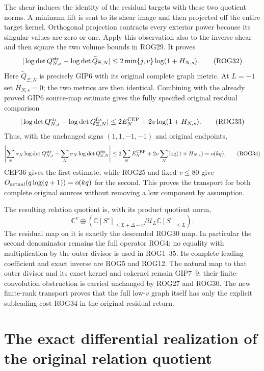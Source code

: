 \documentclass[11pt,a4paper]{article}
\begin{document}
The shear induces the identity of the residual targets with
these two quotient norms. A minimum lift is sent to its
shear image and then projected off the entire target kernel.
Orthogonal projection contracts every exterior power because
its singular values are zero or one. Apply this observation
also to the inverse shear and then square the two volume
bounds in ROG29. It proves
\[
 |\log\det Q_{N,s}^{\rm str}
        -\log\det\widetilde Q_{\Xi,N}|
       \le2\min\{j,v\}\log(1+H_{N,s}).
 \tag{ROG32}
\]
Here $\widetilde Q_{\Xi,N}$ is precisely GIP6 with its
original complete graph metric. At $L=-1$ set $H_{N,s}=0$;
the two metrics are then identical.
Combining with the already proved GIP6 source-map estimate
gives the fully specified original residual comparison
\[
 |\log\det Q_{N,s}^{\rm str}
       -\log\det Q_{\Xi,N}^{\rm fix}|
 \le2E_N^{\rm CEP}+2v\log(1+H_{N,s}).
 \tag{ROG33}
\]
Thus, with the unchanged signs $(1,1,-1,-1)$ and original
endpoints,
\[
 \left|\sum_N\sigma_N\log\det Q_{N,s}^{\rm str}
            -\sum_N\sigma_N\log\det Q_{\Xi,N}^{\rm fix}\right|
 \le2\sum_NE_N^{\rm CEP}
       +2v\sum_N\log(1+H_{N,s})=o(kq).
 \tag{ROG34}
\]
CEP36 gives the first estimate, while ROG25 and fixed
$v\le80$ give $O_{\rm actual}(q\log(q+1))=o(kq)$ for
the second. This proves the transport for both complete
original sources without removing a low component by assumption.

The resulting relation quotient is, with its product quotient norm,
\[
 \mathbb C^v\oplus
   \left(\mathbb C[S']_{\le L+\Delta-v}/
                    \mathcal U_L\mathbb C[S]_{\le L}\right).
 \tag{ROG35}
\]
The residual map on it is exactly the descended ROG30 map.
In particular the second denominator remains the full operator
ROG4; no equality with multiplication by the outer divisor is
used in ROG1--35. Its complete leading coefficient and exact
inverse are ROG5 and ROG12. The natural map to that outer
divisor and its exact kernel and cokernel remain GIP7--9;
their finite-convolution obstruction is carried unchanged by
ROG27 and ROG30. The new finite-rank transport proves that
the full low-$v$ graph itself has only the explicit subleading
cost ROG34 in the original residual return.


\clearpage
\section{The exact differential realization of the original relation quotient}
\label{sec:RDS}
\end{document}
